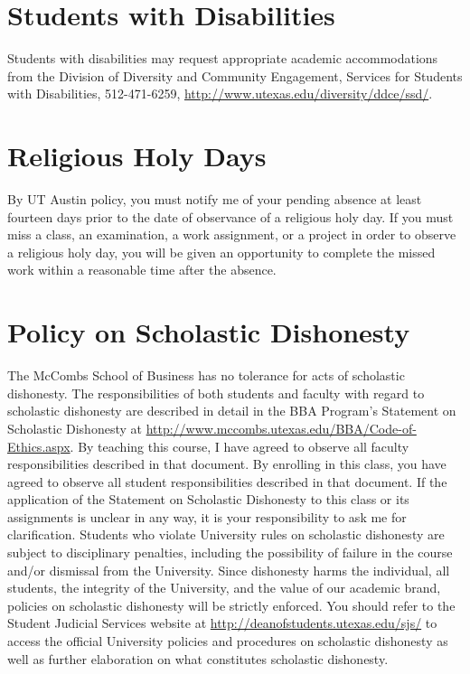 \documentclass[12pt]{article}
\begin{document}
\section*{Students with Disabilities}


Students with disabilities may request appropriate academic accommodations from the Division of Diversity and Community Engagement, Services for Students with Disabilities, 512-471-6259, \url{http://www.utexas.edu/diversity/ddce/ssd/}.


\section*{Religious Holy Days}


By UT Austin policy, you must notify me of your pending absence at least fourteen days prior to the date of observance of a religious holy day.  If you must miss a class, an examination, a work assignment, or a project in order to observe a religious holy day, you will be given an opportunity to complete the missed work within a reasonable time after the absence.


\section*{Policy on Scholastic Dishonesty}


The McCombs School of Business has no tolerance for acts of scholastic dishonesty. The responsibilities of both students and faculty with regard to scholastic dishonesty are described in detail in the BBA Program's Statement on Scholastic Dishonesty at \url{http://www.mccombs.utexas.edu/BBA/Code-of-Ethics.aspx}.  By teaching this course, I have agreed to observe all faculty responsibilities described in that document. By enrolling in this class, you have agreed to observe all student responsibilities described in that document. If the application of the Statement on Scholastic Dishonesty to this class or its assignments is unclear in any way, it is your responsibility to ask me for clarification. Students who violate University rules on scholastic dishonesty are subject to disciplinary penalties, including the possibility of failure in the course and/or dismissal from the University. Since dishonesty harms the individual, all students, the integrity of the University, and the value of our academic brand, policies on scholastic dishonesty will be strictly enforced. You should refer to the Student Judicial Services website at \url{http://deanofstudents.utexas.edu/sjs/} to access the official University policies and procedures on scholastic dishonesty as well as further elaboration on what constitutes scholastic dishonesty.
\end{document}
